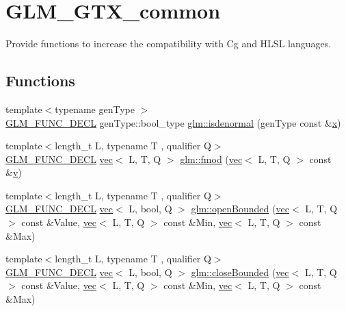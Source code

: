 \hypertarget{group__gtx__common}{}\section{G\+L\+M\+\_\+\+G\+T\+X\+\_\+common}
\label{group__gtx__common}


Provide functions to increase the compatibility with Cg and H\+L\+SL languages.  


\subsection*{Functions}
\begin{DoxyCompactItemize}
\item 
{\footnotesize template$<$typename gen\+Type $>$ }\\\hyperlink{setup_8hpp_ab2d052de21a70539923e9bcbf6e83a51}{G\+L\+M\+\_\+\+F\+U\+N\+C\+\_\+\+D\+E\+CL} gen\+Type\+::bool\+\_\+type \hyperlink{group__gtx__common_ga74aa7c7462245d83bd5a9edf9c6c2d91}{glm\+::isdenormal} (gen\+Type const \&\hyperlink{_s_d_l__opengl_8h_ad0e63d0edcdbd3d79554076bf309fd47}{x})
\item 
{\footnotesize template$<$length\+\_\+t L, typename T , qualifier Q$>$ }\\\hyperlink{setup_8hpp_ab2d052de21a70539923e9bcbf6e83a51}{G\+L\+M\+\_\+\+F\+U\+N\+C\+\_\+\+D\+E\+CL} \hyperlink{structglm_1_1vec}{vec}$<$ L, T, Q $>$ \hyperlink{group__gtx__common_gae5e80425df9833164ad469e83b475fb4}{glm\+::fmod} (\hyperlink{structglm_1_1vec}{vec}$<$ L, T, Q $>$ const \&\hyperlink{_s_d_l__opengl_8h_a10a82eabcb59d2fcd74acee063775f90}{v})
\item 
{\footnotesize template$<$length\+\_\+t L, typename T , qualifier Q$>$ }\\\hyperlink{setup_8hpp_ab2d052de21a70539923e9bcbf6e83a51}{G\+L\+M\+\_\+\+F\+U\+N\+C\+\_\+\+D\+E\+CL} \hyperlink{structglm_1_1vec}{vec}$<$ L, bool, Q $>$ \hyperlink{group__gtx__common_gafd303042ba2ba695bf53b2315f53f93f}{glm\+::open\+Bounded} (\hyperlink{structglm_1_1vec}{vec}$<$ L, T, Q $>$ const \&Value, \hyperlink{structglm_1_1vec}{vec}$<$ L, T, Q $>$ const \&Min, \hyperlink{structglm_1_1vec}{vec}$<$ L, T, Q $>$ const \&Max)
\item 
{\footnotesize template$<$length\+\_\+t L, typename T , qualifier Q$>$ }\\\hyperlink{setup_8hpp_ab2d052de21a70539923e9bcbf6e83a51}{G\+L\+M\+\_\+\+F\+U\+N\+C\+\_\+\+D\+E\+CL} \hyperlink{structglm_1_1vec}{vec}$<$ L, bool, Q $>$ \hyperlink{group__gtx__common_gab7d89c14c48ad01f720fb5daf8813161}{glm\+::close\+Bounded} (\hyperlink{structglm_1_1vec}{vec}$<$ L, T, Q $>$ const \&Value, \hyperlink{structglm_1_1vec}{vec}$<$ L, T, Q $>$ const \&Min, \hyperlink{structglm_1_1vec}{vec}$<$ L, T, Q $>$ const \&Max)
\end{DoxyCompactItemize}


